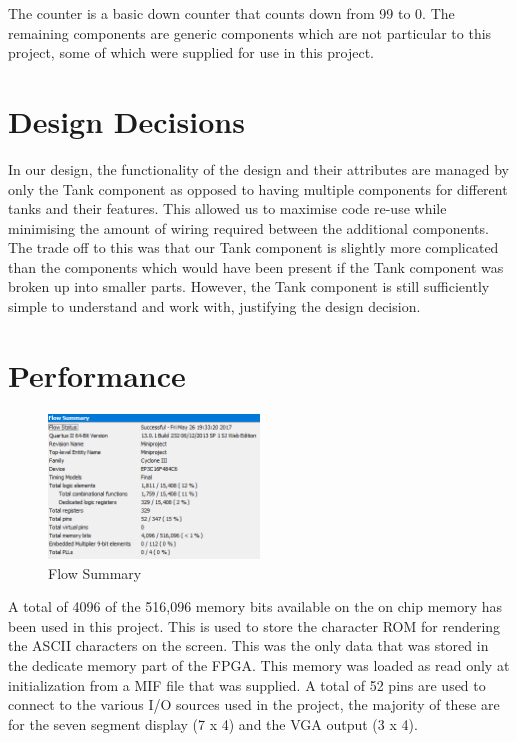 \documentclass{article}
\begin{document}
The counter is a basic down counter that counts down from 99 to 0. The remaining components are generic components which are not particular to this project, some of which were supplied for use in this project.

\section{Design Decisions}

In our design, the functionality of the design and their attributes are managed by only the Tank component as opposed to having multiple components for different tanks and their features. This allowed us to maximise code re-use while minimising the amount of wiring required between the additional components. The trade off to this was that our Tank component is slightly more complicated than the components which would have been present if the Tank component was broken up into smaller parts. However, the Tank component is still sufficiently simple to understand and work with, justifying the design decision.

\section{Performance}

\begin{figure}[!h]
\centerline{\includegraphics[width=0.5\textwidth]{flow_summary}}
\caption{Flow Summary}
\label{fig:rawFrame}
\end{figure}

A total of 4096 of the 516,096 memory bits available on the on chip memory has been used in this project. This is used to store the character ROM for rendering the ASCII characters on the screen. This was the only data that was stored in the dedicate memory part of the FPGA. This memory was loaded as read only at initialization from a MIF file that was supplied. A total of 52 pins are used to connect to the various I/O sources used in the project, the majority of these are for the seven segment display (7 x 4) and the VGA output (3 x 4). 
\end{document}
